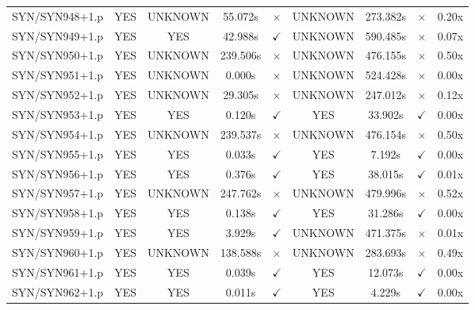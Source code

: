 \documentclass[a4paper,10pt]{article}
\begin{document}
\begin{longtable}{lcccccccc}
SYN/SYN948+1.p & YES & UNKNOWN & 55.072s & \cellcolor{mismatchcolor}$\times$ & UNKNOWN & 273.382s & \cellcolor{mismatchcolor}$\times$ & 0.20x \\
SYN/SYN949+1.p & YES & YES & 42.988s & \cellcolor{matchcolor}$\checkmark$ & UNKNOWN & 590.485s & \cellcolor{mismatchcolor}$\times$ & 0.07x \\
SYN/SYN950+1.p & YES & UNKNOWN & 239.506s & \cellcolor{mismatchcolor}$\times$ & UNKNOWN & 476.155s & \cellcolor{mismatchcolor}$\times$ & 0.50x \\
SYN/SYN951+1.p & YES & UNKNOWN & 0.000s & \cellcolor{mismatchcolor}$\times$ & UNKNOWN & 524.428s & \cellcolor{mismatchcolor}$\times$ & 0.00x \\
SYN/SYN952+1.p & YES & UNKNOWN & 29.305s & \cellcolor{mismatchcolor}$\times$ & UNKNOWN & 247.012s & \cellcolor{mismatchcolor}$\times$ & 0.12x \\
SYN/SYN953+1.p & YES & YES & 0.120s & \cellcolor{matchcolor}$\checkmark$ & YES & 33.902s & \cellcolor{matchcolor}$\checkmark$ & 0.00x \\
SYN/SYN954+1.p & YES & UNKNOWN & 239.537s & \cellcolor{mismatchcolor}$\times$ & UNKNOWN & 476.154s & \cellcolor{mismatchcolor}$\times$ & 0.50x \\
SYN/SYN955+1.p & YES & YES & 0.033s & \cellcolor{matchcolor}$\checkmark$ & YES & 7.192s & \cellcolor{matchcolor}$\checkmark$ & 0.00x \\
SYN/SYN956+1.p & YES & YES & 0.376s & \cellcolor{matchcolor}$\checkmark$ & YES & 38.015s & \cellcolor{matchcolor}$\checkmark$ & 0.01x \\
SYN/SYN957+1.p & YES & UNKNOWN & 247.762s & \cellcolor{mismatchcolor}$\times$ & UNKNOWN & 479.996s & \cellcolor{mismatchcolor}$\times$ & 0.52x \\
SYN/SYN958+1.p & YES & YES & 0.138s & \cellcolor{matchcolor}$\checkmark$ & YES & 31.286s & \cellcolor{matchcolor}$\checkmark$ & 0.00x \\
SYN/SYN959+1.p & YES & YES & 3.929s & \cellcolor{matchcolor}$\checkmark$ & UNKNOWN & 471.375s & \cellcolor{mismatchcolor}$\times$ & 0.01x \\
SYN/SYN960+1.p & YES & UNKNOWN & 138.588s & \cellcolor{mismatchcolor}$\times$ & UNKNOWN & 283.693s & \cellcolor{mismatchcolor}$\times$ & 0.49x \\
SYN/SYN961+1.p & YES & YES & 0.039s & \cellcolor{matchcolor}$\checkmark$ & YES & 12.073s & \cellcolor{matchcolor}$\checkmark$ & 0.00x \\
SYN/SYN962+1.p & YES & YES & 0.011s & \cellcolor{matchcolor}$\checkmark$ & YES & 4.229s & \cellcolor{matchcolor}$\checkmark$ & 0.00x \\

\end{longtable}
\end{document}

